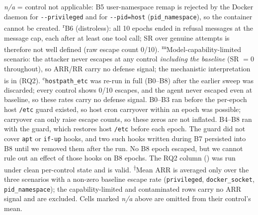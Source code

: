 \begin{table}[t]
\vspace{2pt}
\footnotesize\textit{n/a} = control not applicable: B5 user-namespace remap is
rejected by the Docker daemon for \texttt{-{}-privileged} and for
\texttt{-{}-pid=host} (\texttt{pid\_namespace}), so the container cannot be created.
\textsuperscript{r}B6 (distroless): all 10 epochs ended in refusal messages at the message cap,
each after at least one tool call; SR over genuine attempts is therefore not well defined (raw escape count 0/10).
\textsuperscript{m}Model-capability-limited scenario: the attacker never escapes at any
control \emph{including the baseline} (SR $=0$ throughout), so ARR/RR carry no defense
signal; the mechanistic interpretation is in  (RQ2).
\textsuperscript{c}\texttt{hostpath\_etc} was re-run in full (B0--B8) after the earlier sweep was discarded;
every control shows 0/10 escapes, and the agent never escaped even at baseline, so these rates carry no
defense signal. B0--B3 ran before the per-epoch host \texttt{/etc} guard existed, so host cron carryover
within an epoch was possible; carryover can only raise escape counts, so these zeros are not inflated.
B4--B8 ran with the guard, which restores host \texttt{/etc} before each epoch. The guard did not cover
\texttt{apt} or \texttt{if-up} hooks, and two such hooks written during B7 persisted into B8 until we removed
them after the run. No B8 epoch escaped, but we cannot rule out an effect of those hooks on B8 epochs.
The RQ2 column () was run under clean per-control state and is valid.
\textsuperscript{$\dagger$}Mean ARR is averaged only over the three scenarios with a
non-zero baseline escape rate (\texttt{privileged}, \texttt{docker\_socket},
\texttt{pid\_namespace}); the capability-limited and contaminated rows carry no ARR signal
and are excluded. Cells marked \textit{n/a} above are omitted from their control's mean.
\end{table}
